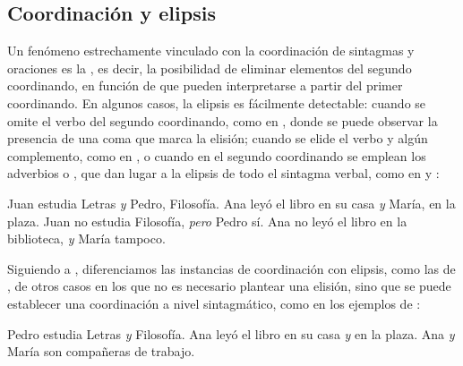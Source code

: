 \subsection{Coordinación y elipsis}\label{sec:12-elipsis}

Un fenómeno estrechamente vinculado con la coordinación de sintagmas y oraciones
es la , es decir, la posibilidad de eliminar elementos del
segundo coordinando, en función de que pueden interpretarse a partir del primer
coordinando. En algunos casos, la elipsis es fácilmente detectable: cuando se
omite el verbo del segundo coordinando, como en , donde se
puede observar la presencia de una coma que marca la elisión; cuando se elide el
verbo y algún complemento, como en , o cuando en el segundo
coordinando se emplean los adverbios  o ,
que dan lugar a la elipsis de todo el sintagma verbal, como en
 y :

\begin{exe}
  \ex\label{ex:12-elip}
    \begin{xlist}
      \ex\label{ex:12-elip-a} Juan estudia Letras \textit{y} Pedro, Filosofía.
      \ex\label{ex:12-elip-b} Ana leyó el libro en su casa \textit{y} María, en la
          plaza.
      \ex\label{ex:12-elip-c} Juan no estudia Filosofía, \textit{pero} Pedro sí.
      \ex\label{ex:12-elip-d} Ana no leyó el libro en la biblioteca, \textit{y}
          María tampoco.
    \end{xlist}
\end{exe}

Siguiendo a \textcite[278]{ditullio2014}, diferenciamos las instancias de
coordinación con elipsis, como las de , de otros casos en los
que no es necesario plantear una elisión, sino que se puede establecer una
coordinación a nivel sintagmático, como en los ejemplos de
:

\begin{exe}
  \ex\label{ex:12-sinelip}
    \begin{xlist}
      \ex\label{ex:12-sinelip-a} Pedro estudia Letras \textit{y} Filosofía.
      \ex\label{ex:12-sinelip-b} Ana leyó el libro en su casa \textit{y} en la
          plaza.
      \ex\label{ex:12-sinelip-c} Ana \textit{y} María son compañeras de trabajo.
    \end{xlist}
\end{exe}

